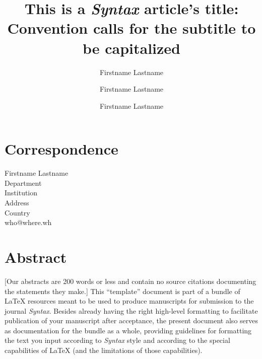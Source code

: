 \documentclass[letterpaper,12pt, twoside]{article}
\begin{document}



\title{This is a \emph{Syntax} article's title: Convention calls for the subtitle to be capitalized}








\author[1]{Firstname Lastname}
\author[2]{Firstname Lastname}
\author[1, 2]{Firstname Lastname}




\maketitle


\section*{Correspondence}
\begin{flushleft}
Firstname Lastname \\ Department \\ Institution \\ Address \\ Country \\  who@where.wh
\end{flushleft}



\section*{Abstract}
[Our abstracts are 200 words or less and contain no source citations documenting the statements they make.] This ``template'' document is part of a bundle of LaTeX resources meant to be used to produce manuscripts for submission to the journal \emph{Syntax}. Besides already having the right high-level formatting to facilitate publication of your manuscript after acceptance, the present document also serves as documentation for the bundle as a whole, providing guidelines for formatting the text you input according to \emph{Syntax} style and according to the special capabilities of LaTeX (and the limitations of those capabilities). 
\end{document}
